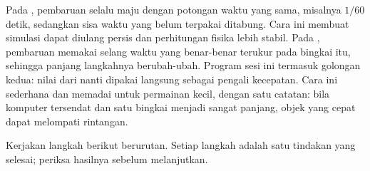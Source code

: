 Pada , pembaruan selalu maju dengan potongan waktu yang
sama, misalnya $1/60$ detik, sedangkan sisa waktu yang belum terpakai
ditabung. Cara ini membuat simulasi dapat diulang persis dan perhitungan fisika
lebih stabil. Pada , pembaruan memakai selang waktu
yang benar-benar terukur pada bingkai itu, sehingga panjang langkahnya
berubah-ubah. Program sesi ini termasuk golongan kedua: nilai dari
 nanti dipakai langsung sebagai pengali kecepatan. Cara ini
sederhana dan memadai untuk permainan kecil, dengan satu catatan: bila
komputer tersendat dan satu bingkai menjadi sangat panjang, objek yang cepat
dapat melompati rintangan.


Kerjakan langkah berikut berurutan. Setiap langkah adalah satu tindakan yang
selesai; periksa hasilnya sebelum melanjutkan.

